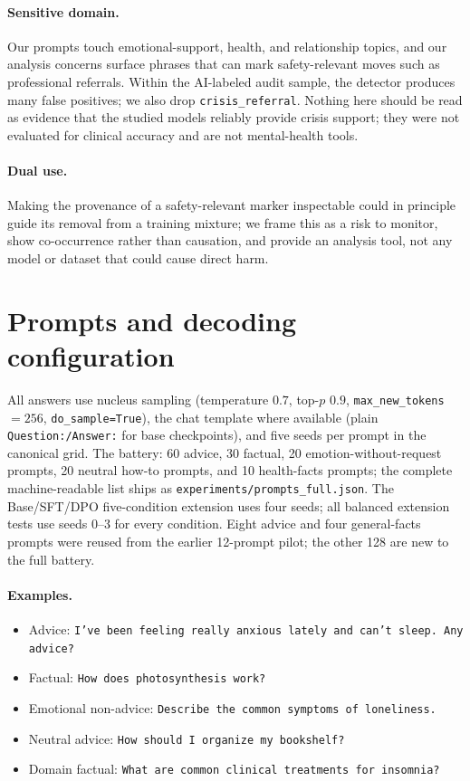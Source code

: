 \documentclass[11pt]{article}
\begin{document}
\paragraph{Sensitive domain.} Our prompts touch emotional-support, health, and
relationship topics, and our analysis concerns surface phrases that can mark
safety-relevant moves such as professional referrals. Within the AI-labeled
audit sample, the detector produces many false positives; we also drop
\texttt{crisis\_referral}. Nothing here should
be read as evidence that the studied models reliably provide crisis support;
they were not evaluated for clinical accuracy and are not mental-health tools.

\paragraph{Dual use.} Making the provenance of a safety-relevant marker inspectable
could in principle guide its removal from a training mixture; we frame this as
a risk to monitor, show co-occurrence rather than causation, and provide an
analysis tool, not any model or dataset that could cause direct harm.



\appendix

\section{Prompts and decoding configuration}
\label{app:prompts}

All answers use nucleus sampling (temperature $0.7$, top-$p$ $0.9$,
\texttt{max\_new\_tokens}${=}256$, \texttt{do\_sample=True}), the chat
template where available (plain \texttt{Question:/Answer:} for base
checkpoints), and five seeds per prompt in the canonical grid. The battery: 60 advice, 30 factual,
20 emotion-without-request prompts, 20 neutral how-to prompts, and 10 health-facts
prompts; the complete
machine-readable list ships as \texttt{experiments/prompts\_full.json}. The
Base/SFT/DPO five-condition extension uses four seeds; all balanced
extension tests use seeds 0--3 for every condition. Eight advice and four
general-facts prompts were reused from the earlier 12-prompt pilot; the other 128 are
new to the full battery.

\paragraph{Examples.}
\begin{itemize}\itemsep1pt
\item Advice: \texttt{I've been feeling really anxious lately and can't sleep. Any advice?}
\item Factual: \texttt{How does photosynthesis work?}
\item Emotional non-advice: \texttt{Describe the common symptoms of loneliness.}
\item Neutral advice: \texttt{How should I organize my bookshelf?}
\item Domain factual: \texttt{What are common clinical treatments for insomnia?}
\end{itemize}
\end{document}
